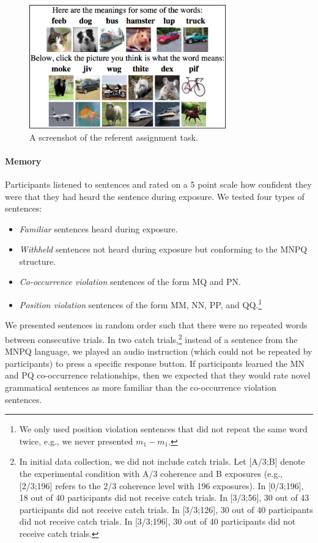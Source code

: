 \documentclass[man,longtable, floatmark]{my-apa6}
\begin{document}
\begin{figure}[t]
  \begin{center}
    \includegraphics[width=8.5cm]{meaning-html-cropped.png}
    \caption{A screenshot of the referent assignment task.}
    \label{meaning-task}
  \end{center}
\end{figure}

\paragraph{Memory}
Participants listened to sentences and rated on a 5 point scale how confident they were that they had heard the sentence during exposure. We tested four types of sentences:

\begin{itemize}
\item \emph{Familiar} sentences heard during exposure.
\item \emph{Withheld} sentences not heard during exposure but conforming to the MNPQ structure.
\item \emph{Co-occurrence violation} sentences of the form MQ and PN.
\item \emph{Position violation} sentences of the form MM, NN, PP, and QQ.\footnote{ We only used position violation sentences that did not repeat the same word twice, e.g., we never presented $m_1 - m_1$.}
\end{itemize}

We presented sentences in random order such that there were no repeated words between consecutive trials. In two catch trials,\footnote{\label{catch-trials} In initial data collection, we did not include catch trials.  Let [A/3;B] denote the experimental condition with A/3 coherence and B exposures (e.g., [2/3;196] refers to the 2/3 coherence level with 196 exposures). In [0/3;196], 18 out of 40 participants did not receive catch trials. In [3/3;56], 30 out of 43 participants did not receive catch trials. In [3/3;126], 30 out of 40 participants did not receive catch trials. In [3/3;196], 30 out of 40 participants did not receive catch trials.} instead of a sentence from the MNPQ language, we played an audio instruction (which could not be repeated by participants) to press a specific response button.  If participants learned the MN and PQ co-occurrence relationships, then we expected that they would rate novel grammatical sentences as more familiar than the co-occurrence violation sentences.
\end{document}
